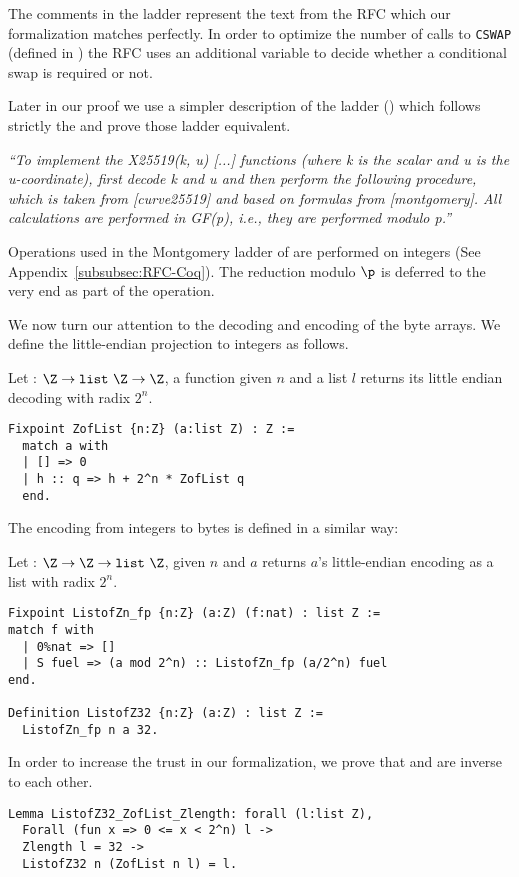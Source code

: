 The comments in the ladder represent the text from the RFC which
our formalization matches perfectly. In order to optimize the
number of calls to \texttt{CSWAP} (defined in )
the RFC uses an additional variable to decide whether a conditional swap
is required or not.

Later in our proof we use a simpler description of the ladder
() which follows strictly the 
and prove those ladder equivalent.

\emph{``To implement the X25519(k, u) [...] functions (where k is
the scalar and u is the u-coordinate), first decode k and u and then
perform the following procedure, which is taken from [curve25519] and
based on formulas from [montgomery].  All calculations are performed
in GF(p), i.e., they are performed modulo p.''}~\cite{rfc7748}

Operations used in the Montgomery ladder of  are performed on
integers (See Appendix~\ref{subsubsec:RFC-Coq}).
The reduction modulo $\p$ is deferred to the very end as part of the
 operation.

We now turn our attention to the decoding and encoding of the byte arrays.
We define the little-endian projection to integers as follows.
\begin{dfn}
Let  : $\Z \rightarrow \texttt{list}~\Z \rightarrow \Z$,
a function given $n$ and a list $l$ returns its little endian decoding with radix $2^n$.
\end{dfn}
\begin{lstlisting}[language=Coq,aboveskip=0pt,belowskip=1pt]
Fixpoint ZofList {n:Z} (a:list Z) : Z :=
  match a with
  | [] => 0
  | h :: q => h + 2^n * ZofList q
  end.
\end{lstlisting}
The encoding from integers to bytes is defined in a similar way:
\begin{dfn}
Let  : $\Z \rightarrow \Z \rightarrow \texttt{list}~\Z$, given
$n$ and $a$ returns $a$'s little-endian encoding as a list with radix $2^n$.
\end{dfn}
\begin{lstlisting}[language=Coq,aboveskip=0pt,belowskip=1pt]
Fixpoint ListofZn_fp {n:Z} (a:Z) (f:nat) : list Z :=
match f with
  | 0%nat => []
  | S fuel => (a mod 2^n) :: ListofZn_fp (a/2^n) fuel
end.

Definition ListofZ32 {n:Z} (a:Z) : list Z :=
  ListofZn_fp n a 32.
\end{lstlisting}
In order to increase the trust in our formalization, we prove that
 and  are inverse to each other.
\begin{lstlisting}[language=Coq,aboveskip=0pt,belowskip=1pt]
Lemma ListofZ32_ZofList_Zlength: forall (l:list Z),
  Forall (fun x => 0 <= x < 2^n) l ->
  Zlength l = 32 ->
  ListofZ32 n (ZofList n l) = l.
\end{lstlisting}

